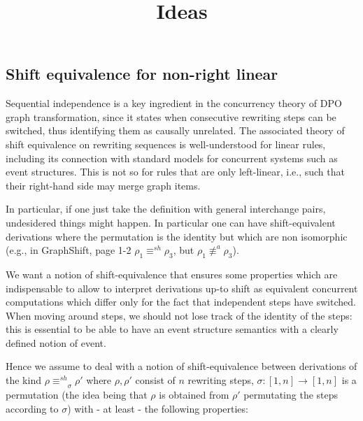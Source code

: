 \documentclass{llncs}
\title{Ideas}
\newcommand{\interval}[2][1]{\ensuremath{[{#1},{#2}]}}
\newcommand{\shifteq}[1][]{\ensuremath{\mathrel{{\equiv}^\mathit{sh}_{#1}}}}
\begin{document}
\maketitle



  
\subsection*{Shift equivalence for non-right linear}

Sequential independence is a key ingredient in the concurrency theory
of DPO graph transformation, since it states when consecutive
rewriting steps can be switched, thus identifying them as causally
unrelated. The associated theory of shift equivalence on rewriting
sequences is well-understood for linear rules, including its
connection with standard models for concurrent systems such as event
structures.
%
This is not so for rules that are only left-linear, i.e., such that
their right-hand side may merge graph items.


In particular, if one just take the definition with general
interchange pairs, undesidered things might happen. In particular one
can have shift-equivalent derivations where the permutation is the
identity but which are non isomorphic (e.g., in GraphShift, page 1-2
$\rho_1 \shifteq \rho_3$, but $\rho_1 \not\equiv^{a} \rho_3$).
  
We want a notion of shift-equivalence that ensures some properties
which are indispensable to allow to interpret derivations up-to shift
as equivalent concurrent computations which differ only for the fact
that independent steps have switched. When moving around steps, we
should not lose track of the identity of the steps: this is essential
to be able to have an event structure semantics with a clearly defined
notion of event.


Hence we assume to deal with a notion of shift-equivalence between
derivations of the kind $\rho \shifteq_\sigma \rho'$ where
$\rho, \rho'$ consist of $n$ rewriting steps,
$\sigma: \interval{n} \to \interval{n}$ is a permutation (the idea
being that $\rho$ is obtained from $\rho'$ permutating the steps
according to $\sigma$) with - at least - the following properties:
\end{document}
